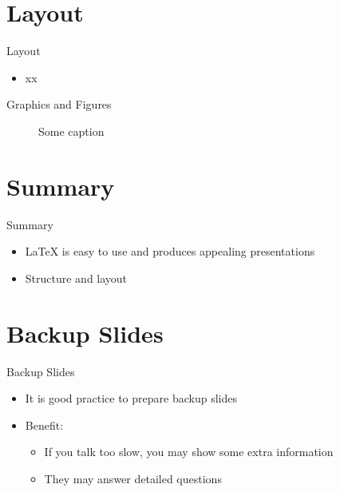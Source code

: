 \documentclass[compress,aspectratio=169]{beamer}
\begin{document}
\section{Layout}
\sectionIntro

\begin{frame}{Layout}
\begin{itemize}
	\item xx
\end{itemize}
\end{frame}

\begin{frame}{Graphics and Figures}
\begin{figure}[tbp]
	\centering
	\qquad %
	\caption{Some caption}
\end{figure}
\end{frame}

\section{Summary}

\begin{frame}{Summary}
	\begin{itemize}
		\item LaTeX is easy to use and produces appealing presentations
		\item Structure and layout
	\end{itemize}
\end{frame}

\backupbegin

\section{Backup Slides}
\begin{frame}{Backup Slides}
	\begin{itemize}
		\item It is good practice to prepare backup slides
		\item Benefit:
		\begin{itemize}
			\item If you talk too slow, you may show some extra information
			\item They may answer detailed questions
		\end{itemize}
	\end{itemize}
\end{frame}

\backupend
\end{document}
